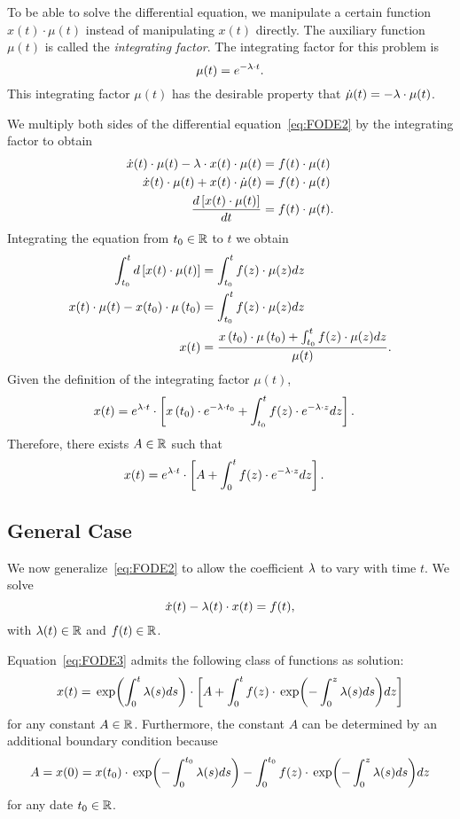 \documentclass[letterpaper,12pt,leqno]{article}
\begin{document}
To be able to solve the differential equation, we manipulate a certain function $x(t)\cdot \mu(t)$ instead of manipulating $x(t)$ directly. The auxiliary function $\mu(t) $ is called the \textit{integrating factor}. The integrating factor for this problem is 
\[\mu(t) =e^{-\lambda \cdot t}.\]
This integrating factor $\mu(t)$ has the desirable property that $\dot{\mu}(t) =-\lambda \cdot \mu(t)$.

We multiply both sides of the differential equation~\eqref{eq:FODE2} by the integrating factor to obtain
\begin{align*}
\dot{x}(t) \cdot \mu(t) -\lambda \cdot x(t)\cdot  \mu(t) & =f(t) \cdot \mu(t)\\
\dot{x}(t) \cdot\mu(t) +x(t) \cdot\dot{\mu}(t) &=f(t)\cdot \mu(t)\\
\frac{d \left[ x(t) \cdot \mu(t) \right]}{d t}& =f(t) \cdot\mu(t).
\end{align*}
Integrating the equation from $t_{0}\in \mathbb{R}$ to $t$ we obtain
\begin{align}
\int_{t_{0}}^{t} d\left[ x(t) \cdot \mu(t) \right]&=\int_{t_{0}}^{t}f(z) \cdot \mu(z) dz\nonumber\\
x(t)\cdot \mu(t)-x(t_{0})\cdot \mu\left( t_{0} \right)&=\int_{t_{0}}^{t}f(z)\cdot  \mu(z) dz\nonumber\\
x(t)& =\frac{x\left( t_{0} \right) \cdot \mu\left( t_{0} \right)+\int_{t_{0}}^{t}f(z) \cdot \mu(z) dz}{\mu(t)}.\label{eq:INTER}
\end{align}
Given the definition of the integrating factor $\mu(t)$, 
\begin{align*}
x(t)& =e^{\lambda \cdot t} \cdot \left[ x\left( t_{0} \right) \cdot e^{-\lambda\cdot t_{0}}+\int_{t_{0}}^{t}f(z) \cdot e^{-\lambda \cdot z} dz \right].
\end{align*}
Therefore, there exists $A\in \mathbb{R}$ such that 
\begin{align*}
x(t)& =e^{\lambda \cdot t} \cdot \left[ A+\int_{0}^{t}f(z) \cdot e^{-\lambda \cdot z} dz \right] .
\end{align*}

\subsection{General Case}

We now generalize~\eqref{eq:FODE2} to allow the coefficient $\lambda$ to vary with time $t$. We solve
\begin{equation}
\dot{x}(t) -\lambda(t) \cdot x(t) =f(t),\label{eq:FODE3}
\end{equation}
with $\lambda(t)\in \mathbb{R}$ and  $f(t)\in \mathbb{R}$. 

Equation~\eqref{eq:FODE3} admits the following class of functions as solution:
\begin{equation}
x(t)=\exp{\int_{0}^{t}\l(s) ds} \cdot \bs{A+\int_{0}^{t}f(z) \cdot \exp{-\int_{0}^{z}\l(s)ds} dz} \label{eq:FODE3sol}
\end{equation}
for any constant $A\in \mathbb{R}$. Furthermore, the constant $A$ can be determined by an additional boundary condition because
\[A=x(0)=x(t_{0})\cdot \exp{-\int_{0}^{t_{0}}\l(s)ds}-\int_{0}^{t_{0}}f(z) \cdot \exp{-\int_{0}^{z}\l(s)ds} dz\]
for any date $t_{0}\in \mathbb{R}$.
\end{document}
